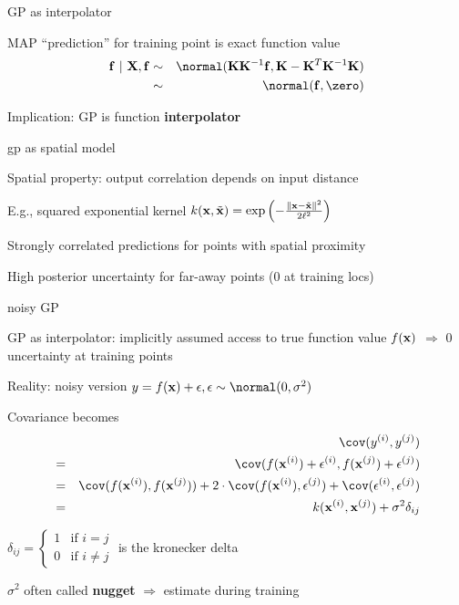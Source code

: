 \documentclass[11pt,compress,t,notes=noshow, xcolor=table]{beamer}
\begin{document}
\begin{framei}[sep=L]{GP as interpolator}
\item MAP ``prediction'' for training point is exact function value
\begin{eqnarray*}
\fv ~|~ \Xmat, \fv &\sim& \normal(\Kmat\Kinv\fv, \Kmat - \Kmat^T \Kinv \Kmat) \\ &\sim& \normal(\fv, \zero)
\end{eqnarray*}
\item Implication: GP is function \textbf{interpolator}
\vfill
{}
\end{framei}

\begin{framei}[sep=L]{gp as spatial model}
\item Spatial property: output correlation depends on input distance
\item E.g., squared exponential kernel $k(\mathbf{x}, \tilde{\mathbf{x}}) = \exp \left(-\frac{\| \mathbf{x} - \tilde{\mathbf{x}} \|^2}{2\ell^2} \right)$
\item Strongly correlated predictions for points with spatial proximity
\item High posterior uncertainty for far-away points (0 at training locs)
\vfill
{}
\end{framei}

\begin{framei}[sep=M]{noisy GP}
\item GP as interpolator: implicitly assumed access to true function value $f(\mathbf{x})$ $\Rightarrow$ 0 uncertainty at training points
\item Reality: noisy version
$y = \fx + \eps, \eps \sim\normal(0, \sigma^2)$
\item Covariance becomes 
\begin{eqnarray*} 
&&\cov(y^{(i)}, y^{(j)}) \\ &=&  \cov (f(\xi) + \epsilon^{(i)}, f(\xi[j]) + \epsilon^{(j)}) \\
&=& \cov(f(\xi), f(\xi[j])) + 2 \cdot \cov(f(\xi), \epsilon^{(j)}) + \cov(\epsilon^{(i)}, \epsilon^{(j)}) 
\\ &=& \kxij + \sigma^2 \delta_{ij}
\end{eqnarray*}
\item $\delta_{ij} = \begin{cases}
1 & \text{if } i = j \\
0 & \text{if } i \neq j
\end{cases}$ is the kronecker delta
\item $\sigma^2$ often called \textbf{nugget} $\Rightarrow$ estimate during training
\end{framei}
\end{document}
